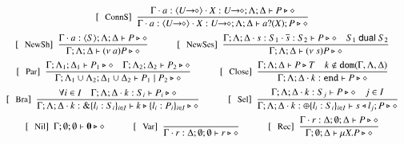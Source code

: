 \begin{figure}[!t]
\[\begin{array}{c}
		\trule{ConnS}~~\tree{
			\Gamma \cat a : \chtype{\shot{U}} \cat X: \shot{U}; \Lambda; \Delta \proves P \hastype \Proc
		}{
			\Gamma \cat a : \chtype{\shot{U}} \cat X: \shot{U}; \Lambda; \Delta \proves \binp{a}{X} P \hastype \Proc
		}
		\\[4mm]
		\trule{NewSh}~~\tree{
			\Gamma\cat a:\chtype{S} ; \Lambda; \Delta \proves P \hastype \Proc
		}{
			\Gamma; \Lambda; \Delta \proves \news{a} P \hastype \Proc}
		\qquad\quad
		\trule{NewSes}~~\tree{
			\Gamma; \Lambda; \Delta \cat s:S_1 \cat \dual{s}: S_2 \proves P \hastype \Proc \quad S_1 \dualof S_2
		}{
			\Gamma; \Lambda; \Delta \proves \news{s} P \hastype \Proc
		}
		\\[4mm]

		\trule{Par}~~\tree{
			\Gamma; \Lambda_{1}; \Delta_{1} \proves P_{1} \hastype \Proc \quad \Gamma; \Lambda_{2}; \Delta_{2} \proves P_{2} \hastype \Proc
		}{
			\Gamma; \Lambda_{1} \cup \Lambda_2; \Delta_{1} \cup \Delta_2 \proves P_1 \Par P_2 \hastype \Proc
		}
		\qquad\quad
		\trule{Close}~~\tree{
			\Gamma; \Lambda; \Delta  \proves P \hastype T \quad k \not\in \dom{\Gamma, \Lambda,\Delta}
		}{
			\Gamma; \Lambda; \Delta \cat k: \tinact  \proves P \hastype \Proc
		}
		\\[4mm]
		\trule{Bra}~~\tree{
			 \forall i \in I \quad \Gamma; \Lambda; \Delta \cat k:S_i \proves P_i \hastype \Proc
		}{
			\Gamma; \Lambda; \Delta \cat k: \btbra{l_i:S_i}_{i \in I} \proves \bbra{k}{l_i:P_i}_{i \in I}\hastype \Proc
		}
		\qquad\quad 
	 	\trule{Sel}~~\tree{
			\Gamma; \Lambda; \Delta \cat k: S_j  \proves P \hastype \Proc \quad j \in I
		}{
			\Gamma; \Lambda; \Delta \cat k:\btsel{l_i:S_i}_{i \in I} \proves \bsel{s}{l_j} P \hastype \Proc
		}
		\\[4mm]

		\trule{Nil}~~\Gamma; \emptyset; \emptyset \proves \inact \hastype \Proc
\qquad \quad
		\trule{Var}~~\tree{
	
		}{
			\Gamma \cat r: \Delta; \emptyset; \emptyset  \proves r \hastype \Proc
		}
		\qquad\quad 

	 	\trule{Rec}~~\tree{
			\Gamma \cat r: \Delta; \emptyset; \Delta  \proves P \hastype \Proc
		}{
			\Gamma ; \emptyset; \Delta  \proves \rec{X}{P} \hastype \Proc
		}
		\\[4mm]



\end{array}\]
\end{figure}
